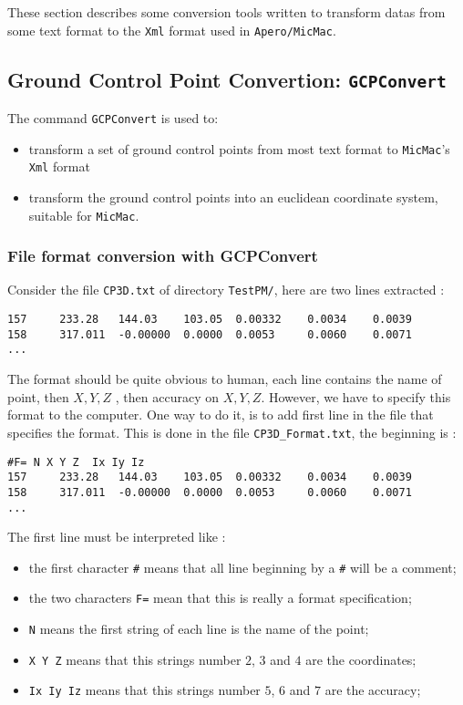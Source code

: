These section describes some conversion tools  written to transform
datas from some text format to the {\tt Xml} format used in {\tt Apero/MicMac}.

\subsection{Ground Control Point Convertion: {\tt GCPConvert} }
\label{GCPConvert}

The command {\tt GCPConvert} is used to:
\begin{itemize}
 \item transform a set of ground control points from most text format to {\tt MicMac}'s {\tt Xml} format
\item transform the ground control points into an euclidean coordinate system, suitable for {\tt MicMac}.
\end{itemize}

\subsubsection{File format conversion with GCPConvert}

Consider the file {\tt CP3D.txt}
of directory {\tt TestPM/}, here are two lines extracted :


\begin{verbatim}
157     233.28   144.03    103.05  0.00332    0.0034    0.0039
158     317.011  -0.00000  0.0000  0.0053     0.0060    0.0071
...
\end{verbatim}

The format should be quite obvious to human, each line contains the name of point,
then $X,Y,Z$ , then accuracy on $X,Y,Z$. However, we have to specify this format to the computer.
One way to do it, is to add first line in the file that specifies the format.
This is done in the file {\tt CP3D\_Format.txt}, the beginning is :


\begin{verbatim}
#F= N X Y Z  Ix Iy Iz
157     233.28   144.03    103.05  0.00332    0.0034    0.0039
158     317.011  -0.00000  0.0000  0.0053     0.0060    0.0071
...
\end{verbatim}

The first line must be interpreted like :

\begin{itemize}
   \item  the first character {\tt \#}  means that  all line beginning by a {\tt \#} will be
          a comment;
   \item  the two characters {\tt F=}  mean that this is really a format specification;
   \item  {\tt N}  means the first string of each line is the name of the point;
   \item  {\tt X Y Z}  means that this strings number $2$, $3$ and $4$ are the coordinates;
   \item  {\tt Ix Iy Iz}  means that this strings number $5$, $6$ and $7$ are the accuracy;
\end{itemize}


